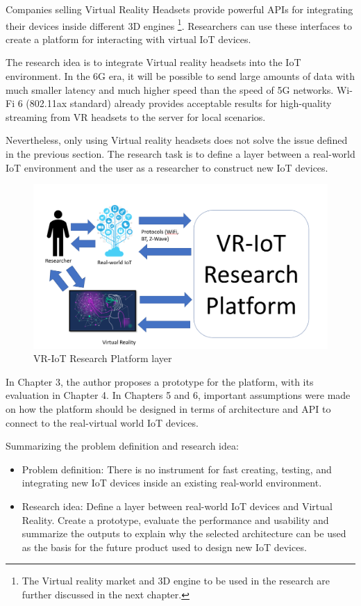 Companies selling Virtual Reality Headsets provide powerful APIs for integrating their devices inside different 3D engines \footnote{The Virtual reality market and 3D engine to be used in the research are further discussed in the next chapter.}. Researchers can use these interfaces to create a platform for interacting with virtual IoT devices.

The research idea is to integrate Virtual reality headsets into the IoT environment. In the 6G era, it will be possible to send large amounts of data with much smaller latency and much higher speed than the speed of 5G networks. Wi-Fi 6 (802.11ax standard) already provides acceptable results for high-quality streaming from VR headsets to the server for local scenarios.

Nevertheless, only using Virtual reality headsets does not solve the issue defined in the previous section. The research task is to define a layer between a real-world IoT environment and the user as a researcher to construct new IoT devices. 

\begin{figure}
  \centering
  \includegraphics[width=0.9\linewidth]{figures/VR-IoTResearchPlatformLayer.png}
  \caption{VR-IoT Research Platform layer}
  \label{fig:VR-IoTResearchPlatformLayer-figure}
\end{figure}

In Chapter 3, the author proposes a prototype for the platform, with its evaluation in Chapter 4. In Chapters 5 and 6, important assumptions were made on how the platform should be designed in terms of architecture and API to connect to the real-virtual world IoT devices.

Summarizing the problem definition and research idea:

\begin{itemize}
    \item Problem definition: There is no instrument for fast creating, testing, and integrating new IoT devices inside an existing real-world environment.  
    \item Research idea: Define a layer between real-world IoT devices and Virtual Reality. Create a prototype, evaluate the performance and usability and summarize the outputs to explain why the selected architecture can be used as the basis for the future product used to design new IoT devices.
\end{itemize}